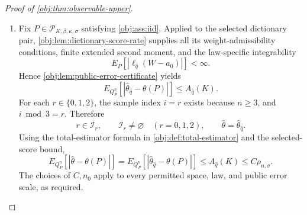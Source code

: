 \begin{proof}[Proof of \cref{obj:thm:observable-upper}]
\begin{enumerate}
\item Fix \(P\in\mathcal P_{K,\beta,\kappa,\sigma}\) satisfying \cref{obj:ass:iid}. Applied to the selected dictionary pair, \cref{obj:lem:dictionary-score-rate} supplies all its weight-admissibility conditions, finite extended second moment, and the law-specific integrability
\[
E_P\!\left[|\ell_{\widehat q}(W-a_0)|\right]<\infty.
\]
Hence \cref{obj:lem:public-error-certificate} yields
\[
E_{Q_P^n}\!\left[
|\widehat\theta_{\widehat q}-\theta(P)|
\right]\le A_{\widehat q}(K).
\]
For each \(r\in\{0,1,2\}\), the sample index \(i=r\) exists because \(n\ge3\), and \(i\bmod3=r\). Therefore
\[
r\in\mathcal I_r,\qquad
\mathcal I_r\ne\varnothing\quad(r=0,1,2),
\qquad
\widehat\theta=\widehat\theta_{\widehat q}.
\]
Using the total-estimator formula in \cref{obj:def:total-estimator} and the selected-score bound,
\[
E_{Q_P^n}\!\left[|\widehat\theta-\theta(P)|\right]
=
E_{Q_P^n}\!\left[
|\widehat\theta_{\widehat q}-\theta(P)|
\right]
\le A_{\widehat q}(K)
\le C\rho_{n,\sigma}.
\]
The choices of \(C,n_0\) apply to every permitted space, law, and public error scale, as required. %
\end{enumerate}
\end{proof}

